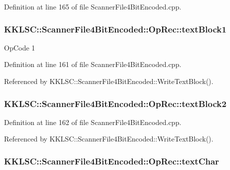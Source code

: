 Definition at line 165 of file Scanner\+File4\+Bit\+Encoded.\+cpp.

\subsubsection[{\texorpdfstring{text\+Block1}{textBlock1}}]{ K\+K\+L\+S\+C\+::\+Scanner\+File4\+Bit\+Encoded\+::\+Op\+Rec\+::text\+Block1}\hypertarget{union_scanner_file4_bit_encoded_1_1_op_rec_a6ee1c66393f907875e2fd62711964fab}{}\label{union_scanner_file4_bit_encoded_1_1_op_rec_a6ee1c66393f907875e2fd62711964fab}
Op\+Code 1 

Definition at line 161 of file Scanner\+File4\+Bit\+Encoded.\+cpp.



Referenced by K\+K\+L\+S\+C\+::\+Scanner\+File4\+Bit\+Encoded\+::\+Write\+Text\+Block().

\subsubsection[{\texorpdfstring{text\+Block2}{textBlock2}}]{ K\+K\+L\+S\+C\+::\+Scanner\+File4\+Bit\+Encoded\+::\+Op\+Rec\+::text\+Block2}\hypertarget{union_scanner_file4_bit_encoded_1_1_op_rec_a1915995bf9087e34eb3964eeb22ac4c1}{}\label{union_scanner_file4_bit_encoded_1_1_op_rec_a1915995bf9087e34eb3964eeb22ac4c1}


Definition at line 162 of file Scanner\+File4\+Bit\+Encoded.\+cpp.



Referenced by K\+K\+L\+S\+C\+::\+Scanner\+File4\+Bit\+Encoded\+::\+Write\+Text\+Block().

\subsubsection[{\texorpdfstring{text\+Char}{textChar}}]{ K\+K\+L\+S\+C\+::\+Scanner\+File4\+Bit\+Encoded\+::\+Op\+Rec\+::text\+Char}\hypertarget{union_scanner_file4_bit_encoded_1_1_op_rec_a3b97c098a5d35aa62269cbdf2ac20d78}{}\label{union_scanner_file4_bit_encoded_1_1_op_rec_a3b97c098a5d35aa62269cbdf2ac20d78}



